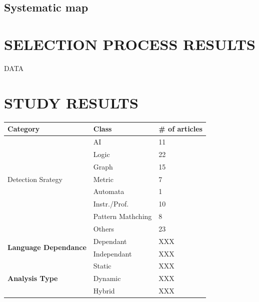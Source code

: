 \documentclass[letterpaper, 10 pt, conference]{ieeeconf}  %
\begin{document}
\subsection{Systematic map}



\section{SELECTION PROCESS RESULTS}

DATA


\section{STUDY RESULTS}

\begin{center}
  \begin{tabular}{ lll }
    \bf Category & \bf Class & \bf \# of articles \\
    \hline
    \multirow{7}{*}{Detection Srategy}
    & \multicolumn{1}{l}{AI}           & \multicolumn{1}{l}{11} \\
    & \multicolumn{1}{l}{Logic}        & \multicolumn{1}{l}{22} \\
    & \multicolumn{1}{l}{Graph}        & \multicolumn{1}{l}{15} \\
    & \multicolumn{1}{l}{Metric}       & \multicolumn{1}{l}{7} \\
    & \multicolumn{1}{l}{Automata}     & \multicolumn{1}{l}{1} \\
    & \multicolumn{1}{l}{Instr./Prof.} & \multicolumn{1}{l}{10} \\
    & \multicolumn{1}{l}{Pattern Mathching}
                                       & \multicolumn{1}{l}{8} \\
    & \multicolumn{1}{l}{Others}       & \multicolumn{1}{l}{23} \\
    \hline
    \multirow{2}{*}{\textbf{Language Dependance}}
    & \multicolumn{1}{l}{Dependant}    & \multicolumn{1}{l}{XXX} \\
    & \multicolumn{1}{l}{Independant}  & \multicolumn{1}{l}{XXX} \\
    \hline
    \multirow{3}{*}{\textbf{Analysis Type}}
    & \multicolumn{1}{l}{Static}       & \multicolumn{1}{l}{XXX} \\
    & \multicolumn{1}{l}{Dynamic}      & \multicolumn{1}{l}{XXX} \\
    & \multicolumn{1}{l}{Hybrid}       & \multicolumn{1}{l}{XXX} \\

\end{tabular}
\end{center}
\end{document}
